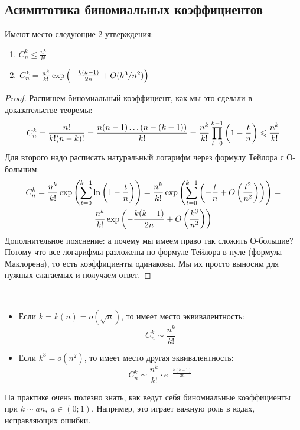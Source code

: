 \subsection{Асимптотика биномиальных коэффициентов}

\begin{lemma}
	Имеют место следующие 2 утверждения:
	\begin{enumerate}
		\item \(C_n^k \le \frac{n^k}{k!}\)
		
		\item \(C_n^k = \frac{n^k}{k!} \exp \left(-\frac{k(k - 1)}{2n} + O(k^3 / n^2)\right)\)
	\end{enumerate}
\end{lemma}

\begin{proof}
	Распишем биномиальный коэффициент, как мы это сделали в доказательстве теоремы:
	\[
		C_n^k = \frac{n!}{k! (n - k)!} = \frac{n(n - 1) \ldots (n - (k - 1))}{k!} = \frac{n^k}{k!} \prod_{t = 0}^{k - 1} \left(1 - \frac{t}{n}\right) \leqslant \frac{n^k}{k!}
	\]
	Для второго надо расписать натуральный логарифм через формулу Тейлора с О-большим:
	\begin{multline*}
		C_n^k = \frac{n^k}{k!} \exp\left(\sum_{t = 0}^{k - 1} \ln\left(1 - \frac{t}{n}\right)\right) = \frac{n^k}{k!} \exp\left(\sum_{t = 0}^{k - 1} \left(-\frac{t}{n} + O\left(\frac{t^2}{n^2}\right)\right)\right) =
		\\
		\frac{n^k}{k!} \exp\left(-\frac{k(k - 1)}{2n} + O\left(\frac{k^3}{n^2}\right)\right)
	\end{multline*}
	Дополнительное пояснение: а почему мы имеем право так сложить О-большие? Потому что все логарифмы разложены по формуле Тейлора в нуле (формула Маклорена), то есть коэффициенты одинаковы. Мы их просто выносим для нужных слагаемых и получаем ответ.
\end{proof}

\begin{corollary}~
	\begin{itemize}
		\item Если $k = k(n) = o(\sqrt{n})$, то имеет место эквивалентность:
		\[
			C_n^k \sim \frac{n^k}{k!}
		\]
		
		\item Если $k^3 = o(n^2)$, то имеет место другая эквивалентность:
		\[
			C_n^k \sim \frac{n^k}{k!} \cdot e^{-\frac{k(k - 1)}{2n}}
		\]
	\end{itemize}
\end{corollary}

\begin{note}
	На практике очень полезно знать, как ведут себя биномиальные коэффициенты при $k \sim an,\ a \in (0; 1)$. Например, это играет важную роль в кодах, исправляющих ошибки.
\end{note}

